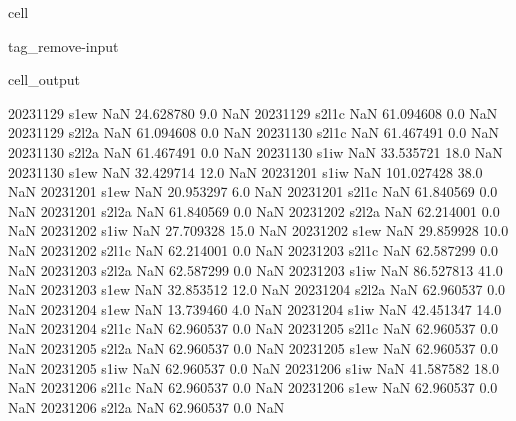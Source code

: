 \documentclass[letterpaper,10pt,english]{jupyterBook}
\begin{document}
\begin{sphinxuseclass}{cell}
\begin{sphinxuseclass}{tag_remove-input}
\begin{sphinxVerbatimOutput}
\begin{sphinxuseclass}{cell_output}
\begin{sphinxVerbatim}[commandchars=\\\{\}]
2023\PYGZhy{}11\PYGZhy{}29        s1\PYGZus{}ew           NaN   24.628780     9.0         NaN
2023\PYGZhy{}11\PYGZhy{}29       s2\PYGZus{}l1c           NaN   61.094608     0.0         NaN
2023\PYGZhy{}11\PYGZhy{}29       s2\PYGZus{}l2a           NaN   61.094608     0.0         NaN
2023\PYGZhy{}11\PYGZhy{}30       s2\PYGZus{}l1c           NaN   61.467491     0.0         NaN
2023\PYGZhy{}11\PYGZhy{}30       s2\PYGZus{}l2a           NaN   61.467491     0.0         NaN
2023\PYGZhy{}11\PYGZhy{}30        s1\PYGZus{}iw           NaN   33.535721    18.0         NaN
2023\PYGZhy{}11\PYGZhy{}30        s1\PYGZus{}ew           NaN   32.429714    12.0         NaN
2023\PYGZhy{}12\PYGZhy{}01        s1\PYGZus{}iw           NaN  101.027428    38.0         NaN
2023\PYGZhy{}12\PYGZhy{}01        s1\PYGZus{}ew           NaN   20.953297     6.0         NaN
2023\PYGZhy{}12\PYGZhy{}01       s2\PYGZus{}l1c           NaN   61.840569     0.0         NaN
2023\PYGZhy{}12\PYGZhy{}01       s2\PYGZus{}l2a           NaN   61.840569     0.0         NaN
2023\PYGZhy{}12\PYGZhy{}02       s2\PYGZus{}l2a           NaN   62.214001     0.0         NaN
2023\PYGZhy{}12\PYGZhy{}02        s1\PYGZus{}iw           NaN   27.709328    15.0         NaN
2023\PYGZhy{}12\PYGZhy{}02        s1\PYGZus{}ew           NaN   29.859928    10.0         NaN
2023\PYGZhy{}12\PYGZhy{}02       s2\PYGZus{}l1c           NaN   62.214001     0.0         NaN
2023\PYGZhy{}12\PYGZhy{}03       s2\PYGZus{}l1c           NaN   62.587299     0.0         NaN
2023\PYGZhy{}12\PYGZhy{}03       s2\PYGZus{}l2a           NaN   62.587299     0.0         NaN
2023\PYGZhy{}12\PYGZhy{}03        s1\PYGZus{}iw           NaN   86.527813    41.0         NaN
2023\PYGZhy{}12\PYGZhy{}03        s1\PYGZus{}ew           NaN   32.853512    12.0         NaN
2023\PYGZhy{}12\PYGZhy{}04       s2\PYGZus{}l2a           NaN   62.960537     0.0         NaN
2023\PYGZhy{}12\PYGZhy{}04        s1\PYGZus{}ew           NaN   13.739460     4.0         NaN
2023\PYGZhy{}12\PYGZhy{}04        s1\PYGZus{}iw           NaN   42.451347    14.0         NaN
2023\PYGZhy{}12\PYGZhy{}04       s2\PYGZus{}l1c           NaN   62.960537     0.0         NaN
2023\PYGZhy{}12\PYGZhy{}05       s2\PYGZus{}l1c           NaN   62.960537     0.0         NaN
2023\PYGZhy{}12\PYGZhy{}05       s2\PYGZus{}l2a           NaN   62.960537     0.0         NaN
2023\PYGZhy{}12\PYGZhy{}05        s1\PYGZus{}ew           NaN   62.960537     0.0         NaN
2023\PYGZhy{}12\PYGZhy{}05        s1\PYGZus{}iw           NaN   62.960537     0.0         NaN
2023\PYGZhy{}12\PYGZhy{}06        s1\PYGZus{}iw           NaN   41.587582    18.0         NaN
2023\PYGZhy{}12\PYGZhy{}06       s2\PYGZus{}l1c           NaN   62.960537     0.0         NaN
2023\PYGZhy{}12\PYGZhy{}06        s1\PYGZus{}ew           NaN   62.960537     0.0         NaN
2023\PYGZhy{}12\PYGZhy{}06       s2\PYGZus{}l2a           NaN   62.960537     0.0         NaN
\end{sphinxVerbatim}


\end{sphinxuseclass}
\end{sphinxVerbatimOutput}
\end{sphinxuseclass}
\end{sphinxuseclass}
\end{document}
